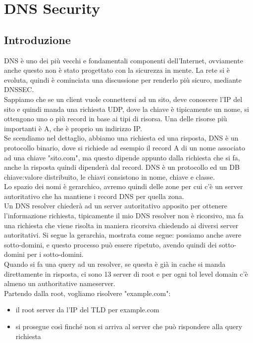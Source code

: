 \documentclass[12pt, oneside]{extbook} %
\begin{document}
\chapter{DNS Security}
\section{Introduzione}
DNS è uno dei più vecchi e fondamentali componenti dell'Internet, ovviamente anche questo non è stato progettato con la sicurezza in mente. La rete si è evoluta, quindi è cominciata una discussione per renderlo più sicuro, mediante DNSSEC.\\Sappiamo che se un client vuole connettersi ad un sito, deve conoscere l'IP del sito e quindi manda una richiesta UDP, dove la chiave è tipicamente un nome, si ottengono uno o più record in base ai tipi di risorsa. Una delle risorse più importanti è A, che è proprio un indirizzo IP.\\Se scendiamo nel dettaglio, abbiamo una richiesta ed una risposta, DNS è un protocollo binario, dove si richiede ad esempio il record A di un nome associato ad una chiave "sito.com", ma questo dipende appunto dalla richiesta che si fa, anche la risposta quindi dipenderà dal record. DNS è un protocollo ed un DB chiave:valore distribuito, le chiavi consistono in nome, chiave e classe.\\Lo spazio dei nomi è gerarchico, avremo quindi delle zone per cui c'è un server autoritativo che ha mantiene i record DNS per quella zona.\\Un DNS resolver chiederà ad un server autoritativo apposito per ottenere l'informazione richiesta, tipicamente il mio DNS resolver non è ricorsivo, ma fa una richiesta che viene risolta in maniera ricorsiva chiedendo ai diversi server autoritativi. Si segue la gerarchia, mostrata come segue:
possiamo anche avere sotto-domini, e questo processo può essere ripetuto, avendo quindi dei sotto-domini per i sotto-domini.\\Quando si fa una query ad un resolver, se questa è già in cache si manda direttamente in risposta, ci sono 13 server di root e per ogni tol level domain c'è almeno un authoritative nameserver.\\Partendo dalla root, vogliamo risolvere "example.com":
\begin{itemize}
	\item il root server da l'IP del TLD per example.com
	\item si prosegue così finché non si arriva al server che può rispondere alla query richiesta
\end{itemize}
\end{document}
